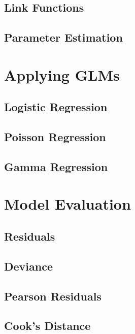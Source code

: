 \documentclass[12pt,a4paper]{report}
\begin{document}
\chapter{Link Functions}

\chapter{Parameter Estimation}

\part{Applying GLMs}

\chapter{Logistic Regression}

\chapter{Poisson Regression}

\chapter{Gamma Regression}

\part{Model Evaluation}

\chapter*{Residuals}

\chapter*{Deviance}

\chapter*{Pearson Residuals}

\chapter*{Cook's Distance}
\end{document}
